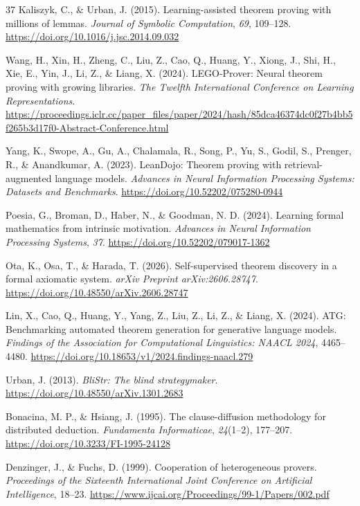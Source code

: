 \documentclass[pdflatex,sn-basic,Numbered]{sn-jnl}
\begin{document}
\begin{thebibliography}{37}
 Kaliszyk, C., \& Urban, J. (2015). Learning-assisted theorem proving with millions of lemmas. \emph{Journal of Symbolic Computation}, \emph{69}, 109--128. \url{https://doi.org/10.1016/j.jsc.2014.09.032}

 Wang, H., Xin, H., Zheng, C., Liu, Z., Cao, Q., Huang, Y., Xiong, J., Shi, H., Xie, E., Yin, J., Li, Z., \& Liang, X. (2024). LEGO-Prover: Neural theorem proving with growing libraries. \emph{The Twelfth International Conference on Learning Representations}. \url{https://proceedings.iclr.cc/paper_files/paper/2024/hash/85dca46374dc0f27b4bb5f265b3d17f0-Abstract-Conference.html}

 Yang, K., Swope, A., Gu, A., Chalamala, R., Song, P., Yu, S., Godil, S., Prenger, R., \& Anandkumar, A. (2023). LeanDojo: Theorem proving with retrieval-augmented language models. \emph{Advances in Neural Information Processing Systems: Datasets and Benchmarks}. \url{https://doi.org/10.52202/075280-0944}

 Poesia, G., Broman, D., Haber, N., \& Goodman, N. D. (2024). Learning formal mathematics from intrinsic motivation. \emph{Advances in Neural Information Processing Systems}, \emph{37}. \url{https://doi.org/10.52202/079017-1362}

 Ota, K., Osa, T., \& Harada, T. (2026). Self-supervised theorem discovery in a formal axiomatic system. \emph{arXiv Preprint arXiv:2606.28747}. \url{https://doi.org/10.48550/arXiv.2606.28747}

 Lin, X., Cao, Q., Huang, Y., Yang, Z., Liu, Z., Li, Z., \& Liang, X. (2024). ATG: Benchmarking automated theorem generation for generative language models. \emph{Findings of the Association for Computational Linguistics: NAACL 2024}, 4465--4480. \url{https://doi.org/10.18653/v1/2024.findings-naacl.279}

 Urban, J. (2013). \emph{BliStr: The blind strategymaker}. \url{https://doi.org/10.48550/arXiv.1301.2683}

 Bonacina, M. P., \& Hsiang, J. (1995). The clause-diffusion methodology for distributed deduction. \emph{Fundamenta Informaticae}, \emph{24}(1--2), 177--207. \url{https://doi.org/10.3233/FI-1995-24128}

 Denzinger, J., \& Fuchs, D. (1999). Cooperation of heterogeneous provers. \emph{Proceedings of the Sixteenth International Joint Conference on Artificial Intelligence}, 18--23. \url{https://www.ijcai.org/Proceedings/99-1/Papers/002.pdf}


\end{thebibliography}
\end{document}
